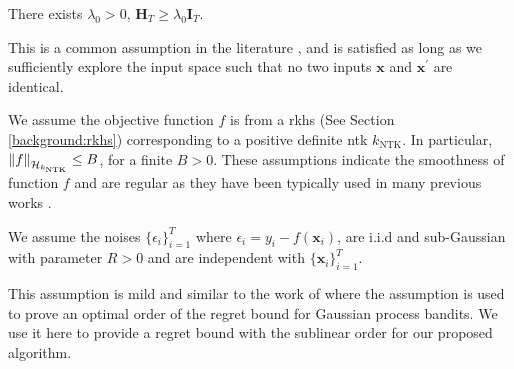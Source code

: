 \begin{assumption} \label{assumption:neural-bo_sufficient_exploration} There exists $\lambda_0 > 0$, 
$\mathbf{H}_T \ge \lambda_0 \mathbf{I}_T$.
\end{assumption}
This is a common assumption in the literature \citep{zhou2020neural,xu2022neural,zhang2021neural}, and is satisfied as long as we sufficiently explore the input space such that no two inputs $\mathbf{x}$ and $\mathbf{x}^\prime$ are identical.  

\begin{assumption}
    We assume the objective function $f$ is from a \ac{rkhs} (See Section \ref{background:rkhs}) corresponding to a positive definite \ac{ntk}  $k_\text{NTK}$. In particular, $\norm{f}_{\mathcal{H}_{k_\text{NTK}}} \leq B$, for a finite $B > 0$. These assumptions indicate the smoothness of function $f$ and are regular as they have been typically used in many previous works \citep{chowdhury2017kernelized, srinivas2009gaussian,vakili2021information}.
\end{assumption}
\begin{assumption}
\label{assumption:neural-bo_iid_noise}
We assume the noises $\{\epsilon_i\}_{i=1}^T$ where $\epsilon_i = y_i - f(\mathbf{x}_i)$, are i.i.d and sub-Gaussian with parameter $R > 0$ and are independent with $\{\mathbf{x}_i\}_{i=1}^T$. 
\end{assumption} 
This assumption is mild and similar to the work of \citet{vakili2021optimal} where the assumption is used to prove an optimal order of the regret bound for Gaussian process bandits. We use it here to provide a regret bound with the sublinear order for our proposed algorithm.    

